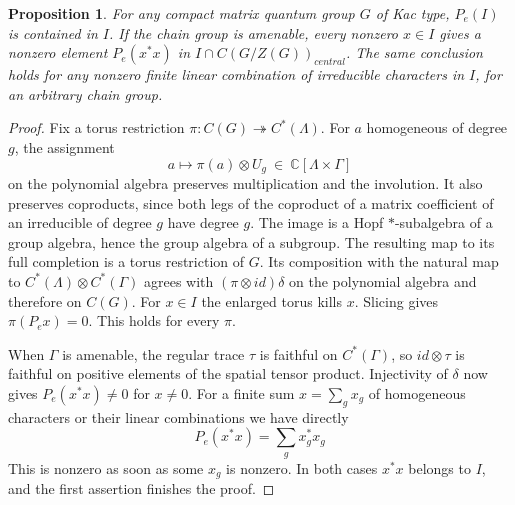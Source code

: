 \documentclass[11pt,a4paper]{article}
\newtheorem{prop}[thm]{Proposition}
\theoremstyle{remark}
\begin{document}
\begin{prop}\label{neutralprojection}
For any compact matrix quantum group $G$ of Kac type, $P_e(I)$ is
contained in $I$. If the chain group is amenable, every nonzero
$x\in I$ gives a nonzero element $P_e(x^*x)$ in $I\cap C(G/Z(G))_{central}$.
The same conclusion holds for any nonzero finite linear combination
of irreducible characters in $I$, for an arbitrary chain group.
\end{prop}
\begin{proof}
Fix a torus restriction $\pi:C(G)\twoheadrightarrow C^*(\Lambda)$.
For $a$ homogeneous of degree $g$, the assignment
\[
 a\longmapsto \pi(a)\otimes U_g\ \in\ \mathbb C[\Lambda\times\Gamma]
\]
on the polynomial algebra preserves multiplication and the involution.
It also preserves coproducts, since both legs of the coproduct of a
matrix coefficient of an irreducible of degree $g$ have degree $g$.
The image is a Hopf $*$-subalgebra of a group algebra, hence the group
algebra of a subgroup. The resulting map to its full completion is a
torus restriction of $G$. Its composition with the natural map to
$C^*(\Lambda)\otimes C^*(\Gamma)$ agrees with
$(\pi\otimes id)\delta$ on the polynomial algebra and
therefore on $C(G)$. For $x\in I$ the enlarged torus kills $x$.
Slicing gives $\pi(P_e x)=0$. This holds for every $\pi$.

When $\Gamma$ is amenable, the regular trace $\tau$ is faithful on
$C^*(\Gamma)$, so $id\otimes\tau$ is faithful on positive
elements of the spatial tensor product. Injectivity of $\delta$ now
gives $P_e(x^*x)\ne0$ for $x\ne0$. For a finite sum $x=\sum_g x_g$
of homogeneous characters or their linear combinations we have directly
\[
 P_e(x^*x)=\sum_g x_g^*x_g
\]
This is nonzero as soon as some $x_g$ is nonzero. In both cases $x^*x$
belongs to $I$, and the first assertion finishes the proof.
\end{proof}
\end{document}
